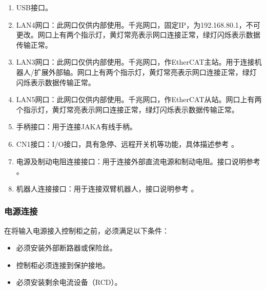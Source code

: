 \documentclass[a4paper,11pt,english,openany,oneside]{sphinxmanual}
\begin{document}
\begin{enumerate}
%
\item {} 
 USB接口。

\item {} 
\sphinxAtStartPar
LAN4网口：此网口仅供内部使用。千兆网口，固定IP，为192.168.80.1，不可更改。网口上有两个指示灯，黄灯常亮表示网口连接正常，绿灯闪烁表示数据传输正常。

\item {} 
\sphinxAtStartPar
LAN3网口：此网口仅供内部使用。千兆网口，作EtherCAT主站。用于连接机器人/扩展外部轴。网口上有两个指示灯，黄灯常亮表示网口连接正常，绿灯闪烁表示数据传输正常。

\item {} 
\sphinxAtStartPar
LAN5网口：此网口仅供内部使用。千兆网口，作EtherCAT从站。网口上有两个指示灯，黄灯常亮表示网口连接正常，绿灯闪烁表示数据传输正常。

\item {} 
\sphinxAtStartPar
手柄接口：用于连接JAKA有线手柄。

\item {} 
\sphinxAtStartPar
CN1接口：I/O接口，具有急停、远程开关机等功能，具体描述参考 {\hyperref[\detokenize{08 _u5b89_u88c5_u4e0e_u8c03_u8bd5:cn1-i-o}]{}}。

\item {} 
\sphinxAtStartPar
电源及制动电阻连接接口：用于连接外部直流电源和制动电阻。接口说明参考 {\hyperref[\detokenize{08 _u5b89_u88c5_u4e0e_u8c03_u8bd5:id58}]{}}。

\item {} 
\sphinxAtStartPar
机器人连接接口：用于连接双臂机器人，接口说明参考 {\hyperref[\detokenize{08 _u5b89_u88c5_u4e0e_u8c03_u8bd5:id66}]{}}。

\end{enumerate}


\subsubsection{电源连接}
\label{\detokenize{08 _u5b89_u88c5_u4e0e_u8c03_u8bd5:id58}}\label{\detokenize{08 _u5b89_u88c5_u4e0e_u8c03_u8bd5:id59}}
\sphinxAtStartPar
在将输入电源接入控制柜之前，必须满足以下条件：
\begin{itemize}
\item {} 
\sphinxAtStartPar
必须安装外部断路器或保险丝。

\item {} 
\sphinxAtStartPar
控制柜必须连接到保护接地。

\item {} 
\sphinxAtStartPar
必须安装剩余电流设备（RCD）。

\end{itemize}
\end{document}
